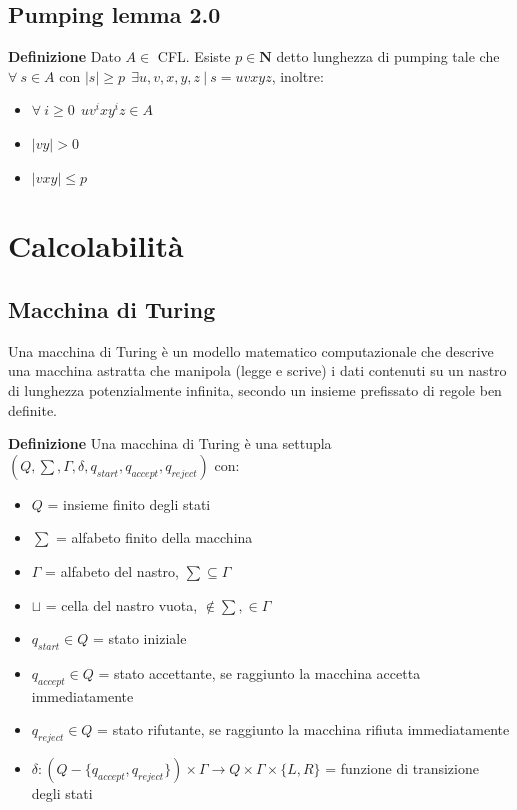 \documentclass{article}
\begin{document}
\subsection{Pumping lemma 2.0}

\noindent\textbf{Definizione} Dato $A\in$ CFL. Esiste $p\in\mathbf{N}$ detto lunghezza di pumping tale che $\forall\ s \in A \text{ con } |s|\geq p\ \ \exists u,v,x,y,z\ |\ s=uvxyz$, inoltre:
\begin{itemize}
    \item $\forall\ i\geq0\ \ uv^ixy^iz\in A$
    \item $|vy|>0$
    \item $|vxy|\leq p$\newline
\end{itemize}

\section{Calcolabilità}

\subsection{Macchina di Turing}

Una macchina di Turing è un modello matematico computazionale che descrive una macchina astratta che manipola (legge e scrive) i dati contenuti su un nastro di lunghezza potenzialmente infinita, secondo un insieme prefissato di regole ben definite.\newline

\noindent\textbf{Definizione} Una macchina di Turing è una settupla $(Q,\sum,\Gamma,\delta,q_{start},q_{accept},q_{reject})$ con:
\begin{itemize}
    \item $Q$ = insieme finito degli stati
    \item $\sum$ = alfabeto finito della macchina
    \item $\Gamma$ = alfabeto del nastro, $\sum\subseteq\Gamma$
    \item $\sqcup$ = cella del nastro vuota, $\notin\sum,\in\Gamma$
    \item $q_{start}\in Q$ = stato iniziale
    \item $q_{accept}\in Q$ = stato accettante, se raggiunto la macchina accetta immediatamente
    \item $q_{reject}\in Q$ = stato rifutante, se raggiunto la macchina rifiuta immediatamente
    \item $\delta:(Q-\{q_{accept},q_{reject}\})\times \Gamma \rightarrow Q\times\Gamma\times\{L,R\}$ = funzione di transizione degli stati\newline
\end{itemize}
\end{document}

